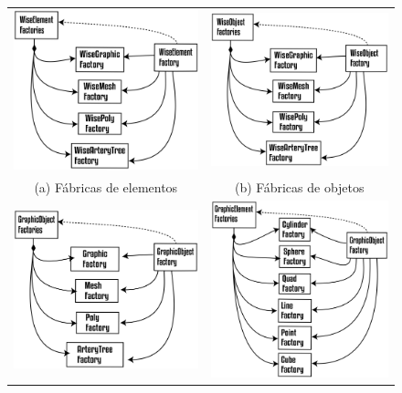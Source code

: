 \begin{figure}
	\begin{tabularx}{\textwidth}{cc}
		\includegraphics[width=0.5\linewidth]{Figures/WiseElementFactories@16x.png} &   \includegraphics[width=0.5\linewidth]{Figures/WiseObjectFactories@16x.png} \\
		(a) Fábricas de elementos & (b) Fábricas de objetos \\[6pt]
		\includegraphics[width=0.5\linewidth]{Figures/GraphicObjectFactories@16x.png} &   \includegraphics[width=0.5\linewidth]{Figures/GraphicElementFactories@16x.png} \\

\end{tabularx}
\end{figure}
